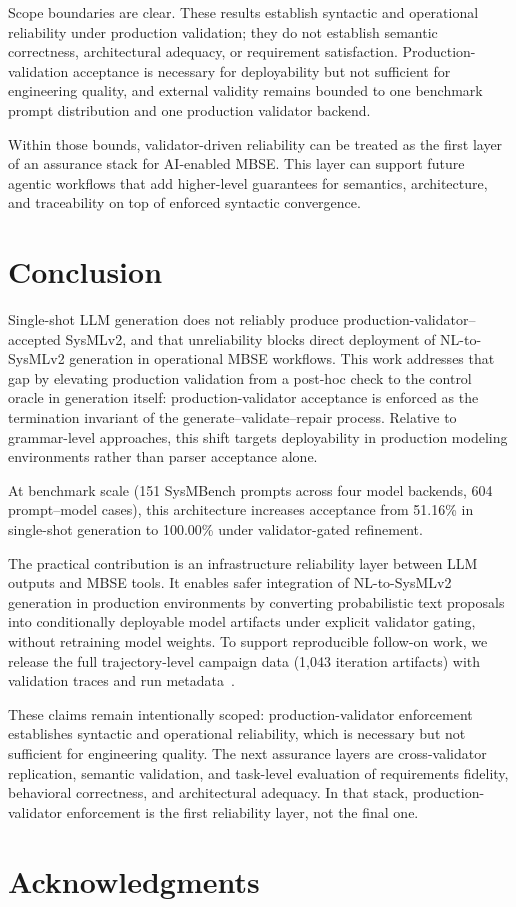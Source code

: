 \documentclass[colorlinks,upint,subscriptcorrection,varvw,hyphenate,balance]{asmeconf} %
\begin{document}
Scope boundaries are clear. These results establish syntactic and operational reliability under production validation; they do not establish semantic correctness, architectural adequacy, or requirement satisfaction. Production-validation acceptance is necessary for deployability but not sufficient for engineering quality, and external validity remains bounded to one benchmark prompt distribution and one production validator backend.

Within those bounds, validator-driven reliability can be treated as the first layer of an assurance stack for AI-enabled MBSE. This layer can support future agentic workflows that add higher-level guarantees for semantics, architecture, and traceability on top of enforced syntactic convergence.

\section{Conclusion}
Single-shot LLM generation does not reliably produce production-validator--accepted SysMLv2, and that unreliability blocks direct deployment of NL-to-SysMLv2 generation in operational MBSE workflows. This work addresses that gap by elevating production validation from a post-hoc check to the control oracle in generation itself: production-validator acceptance is enforced as the termination invariant of the generate--validate--repair process. Relative to grammar-level approaches, this shift targets deployability in production modeling environments rather than parser acceptance alone.

At benchmark scale (151 SysMBench prompts across four model backends, 604 prompt--model cases), this architecture increases acceptance from 51.16\% in single-shot generation to 100.00\% under validator-gated refinement.

The practical contribution is an infrastructure reliability layer between LLM outputs and MBSE tools. It enables safer integration of NL-to-SysMLv2 generation in production environments by converting probabilistic text proposals into conditionally deployable model artifacts under explicit validator gating, without retraining model weights. To support reproducible follow-on work, we release the full trajectory-level campaign data (1,043 iteration artifacts) with validation traces and run metadata~\cite{sysmbenchCompilerLoopRepo2026}.

These claims remain intentionally scoped: production-validator enforcement establishes syntactic and operational reliability, which is necessary but not sufficient for engineering quality. The next assurance layers are cross-validator replication, semantic validation, and task-level evaluation of requirements fidelity, behavioral correctness, and architectural adequacy. In that stack, production-validator enforcement is the first reliability layer, not the final one.

\section*{Acknowledgments}




\appendix

\end{document}
